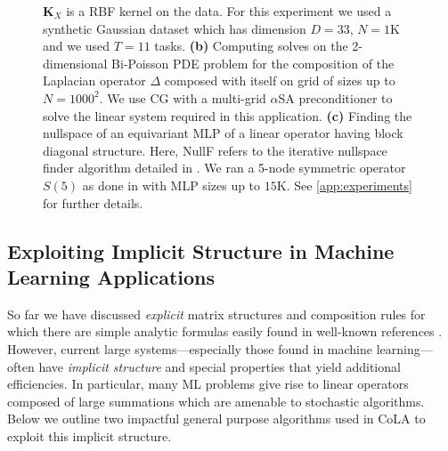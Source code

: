 \documentclass{article}
\newcommand{\mbf}[1]{{\boldsymbol{\mathbf{#1}}}}
\renewcommand{\bm}{\mbf}
\begin{document}
\begin{figure}
{      $\bm{K}_{X}$ is a RBF kernel on the data.
      For this experiment we used a synthetic Gaussian dataset which has dimension $D=33$, $N=1$K and we used $T=11$ tasks.
      \textbf{(b)} Computing solves on the 2-dimensional Bi-Poisson PDE problem for the composition of the Laplacian operator
      $\Delta$ composed with itself on grid of sizes up to $N=1000^{2}$.
      We use CG with a multi-grid $\alpha$SA preconditioner \citep{brezina2006asa} to solve the linear system required in this application.
      \textbf{(c)} Finding the nullspace of an equivariant MLP of a linear operator having block diagonal structure.
      Here, NullF refers to the iterative nullspace finder algorithm detailed in \citep{finzi2021practical}.
      We ran a 5-node symmetric operator $S(5)$ as done in \citep{finzi2021practical} with MLP sizes up to $15$K.
      See \autoref{app:experiments} for further details.
    }
    \vspace{-1.1em}
    \label{fig:structure}
\end{figure}

\subsection{Exploiting Implicit Structure in Machine Learning Applications} \label{subsec:beyond}
So far we have discussed \emph{explicit} matrix structures and composition rules for which there are simple analytic formulas easily found in well-known references \citep[e.g.][]{golub2018matrix, saad2003iterative, trefethen1997NLA}.
However, current large systems---especially those found in machine learning---
often have \emph{implicit structure} and special properties that yield additional efficiencies.
In particular, many ML problems give rise to linear operators composed of large summations which are amenable to stochastic algorithms.
Below we outline two impactful general purpose algorithms used in CoLA to exploit this implicit structure.
\end{document}
